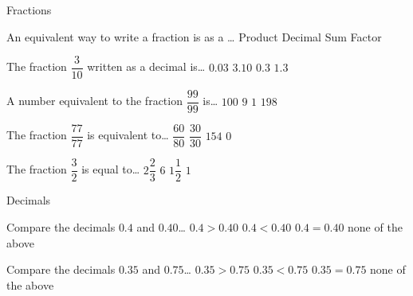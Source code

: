 \documentclass{jj_game} %
\begin{document}
\begin{Questions}

\begin{Category}{Fractions}


\begin{Question}

An equivalent way to write a fraction is as a \dots
{} Product
 Decimal
 Sum
 Factor
\end{Question}

\begin{Question}

The fraction $\dfrac{3}{10}$ written as a decimal is\dots
{} $0.03$
 $3.10$
 $0.3$
 $1.3$
\end{Question}

\begin{Question}

A number equivalent to the fraction $\dfrac{99}{99}$ is\dots
{} $100$
 $9$
 $1$
 $198$
\end{Question}

\begin{Question}

The fraction $\dfrac{77}{77}$ is equivalent to\dots
{} $\dfrac{60}{80}$
 $\dfrac{30}{30}$
 $154$
 $0$
\end{Question}

\begin{Question}

The fraction $\dfrac{3}{2}$ is equal to\dots
{} $2\dfrac{2}{3}$
 $6$
 $1\dfrac{1}{2}$  %
 $1$
\end{Question}

\end{Category}


\begin{Category}{Decimals}

\begin{Question}

Compare the decimals $0.4$ and $0.40$\dots
{} $0.4>0.40$
 $0.4<0.40$
 $0.4=0.40$
 none of the above
\end{Question}

\begin{Question}

Compare the decimals $0.35$ and $0.75$\dots
{} $0.35>0.75$
 $0.35<0.75$
 $0.35=0.75$
 none of the above
\end{Question}


\end{Category}
\end{Questions}
\end{document}
